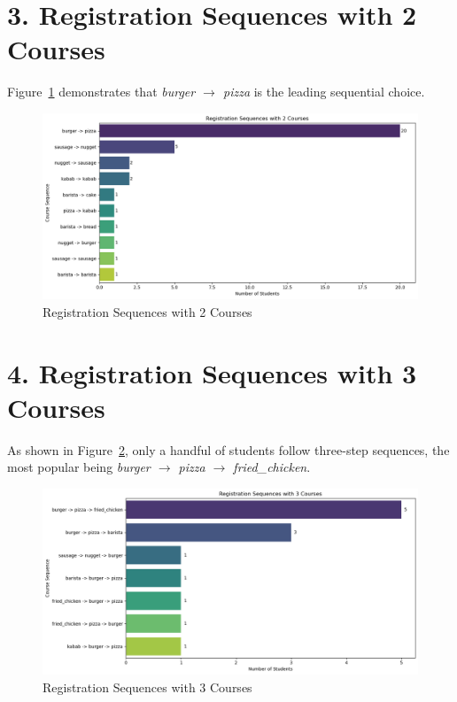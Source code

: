 \documentclass[12pt,a4paper]{article}
\begin{document}
\section*{3. Registration Sequences with 2 Courses}
Figure~\ref{fig:seq2} demonstrates that \textit{burger $\rightarrow$ pizza} is the leading sequential choice.

\begin{figure}[h!]
    \centering
    \includegraphics[width=1\textwidth]{Registration Sequences with 2 Courses.png}
    \caption{Registration Sequences with 2 Courses}
    \label{fig:seq2}
\end{figure}

\section*{4. Registration Sequences with 3 Courses}
As shown in Figure~\ref{fig:seq3}, only a handful of students follow three-step sequences, the most popular being \textit{burger $\rightarrow$ pizza $\rightarrow$ fried\_chicken}.

\begin{figure}[h!]
    \centering
    \includegraphics[width=1\textwidth]{Registration Sequences with 3 Courses.png}
    \caption{Registration Sequences with 3 Courses}
    \label{fig:seq3}
\end{figure}
\end{document}
